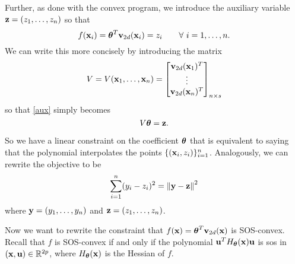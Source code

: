 \documentclass[11pt]{article}
\begin{document}
Further, as done with the convex program, we introduce the auxiliary variable ${\bf z} = (z_1, \dotsc, z_n)$ so that 
\begin{equation}\label{aux}
f({\bf x}_i) = {\boldsymbol\theta}^T{\bf v}_{2d}({\bf x}_i) = z_i \qquad\forall\ i = 1, \dotsc, n.
\end{equation}
We can write this more concisely by introducing the matrix
\[
V = V({\bf x}_1, \dotsc, {\bf x}_n) = \begin{bmatrix}
{\bf v}_{2d}({\bf x}_1)^T \\
\vdots \\
{\bf v}_{2d}({\bf x}_n)^T
\end{bmatrix}_{n \times s}
\]
so that \eqref{aux} simply becomes
\begin{equation}\label{sos-poly}
V{\boldsymbol\theta} = {\bf z}.
\end{equation}

So we have a linear constraint on the coefficient ${\boldsymbol\theta}$ that is equivalent to saying that the polynomial interpolates the points $\{({\bf x}_i, z_i)\}_{i=1}^n$. Analogously, we can rewrite the objective to be
\begin{equation}\label{sos-reg-obj2}
\sum_{i=1}^n(y_i - z_i)^2 = \left\lVert {\bf y} - {\bf z} \right\rVert^2
\end{equation}
where ${\bf y} = (y_1, \dotsc, y_n)$ and ${\bf z} = (z_1, \dotsc, z_n)$.


Now we want to rewrite the constraint that $f({\bf x}) = {\boldsymbol\theta}^T{\bf v}_{2d}({\bf x})$ is SOS-convex. Recall that $f$ is SOS-convex if and only if the polynomial ${\bf u}^TH_{\boldsymbol\theta}({\bf x}){\bf u}$ is sos in $({\bf x}, {\bf u}) \in \mathbb R^{2p}$, where $H_{\boldsymbol\theta}({\bf x})$ is the Hessian of $f$.
\end{document}
